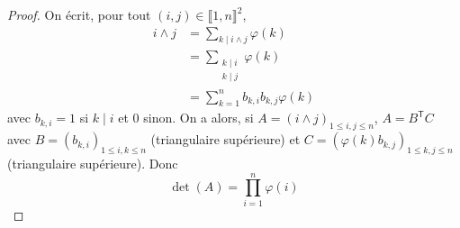 \documentclass[12pt]{article}
\begin{document}
\begin{proof}
    On écrit, pour tout $(i,j)\in\llbracket1,n\rrbracket^{2}$,
    \begin{align}
        i\wedge j
        &=\sum_{k\mid i\wedge j}\varphi(k)\\
        &=\sum_{\substack{k\mid i\\ k\mid j}}\varphi(k)\\
        &=\sum_{k=1}^{n}b_{k,i}b_{k,j}\varphi(k)
    \end{align}
    avec $b_{k,i}=1$ si $k\mid i$ et 0 sinon. On a alors, si $A=\left(i\wedge j\right)_{1\leqslant i,j\leqslant n}$, $A=B^{\mathsf{T}}C$ avec $B=(b_{k,i})_{1\leqslant i,k\leqslant n}$ (triangulaire supérieure) et $C=\left(\varphi(k)b_{k,j}\right)_{1\leqslant k,j\leqslant n}$ (triangulaire supérieure). Donc 
    \begin{equation}
        \boxed{\det(A)=\prod_{i=1}^{n}\varphi(i)}
    \end{equation}
\end{proof}
\end{document}
